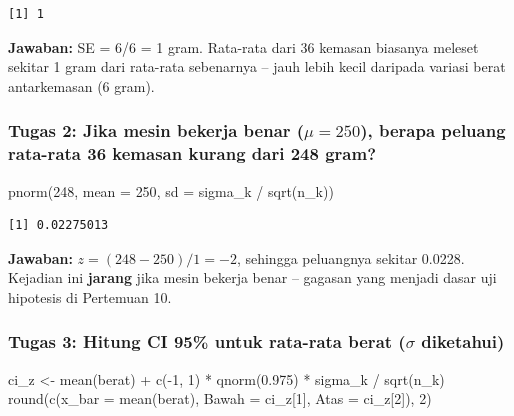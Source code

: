 \documentclass[
  indonesian,
  letterpaper,
]{book}
\newenvironment{Shaded}{\begin{snugshade}}{\end{snugshade}}
\newcommand{\AttributeTok}[1]{\textcolor[rgb]{0.40,0.45,0.13}{#1}}
\newcommand{\DecValTok}[1]{\textcolor[rgb]{0.68,0.00,0.00}{#1}}
\newcommand{\FloatTok}[1]{\textcolor[rgb]{0.68,0.00,0.00}{#1}}
\newcommand{\FunctionTok}[1]{\textcolor[rgb]{0.28,0.35,0.67}{#1}}
\newcommand{\NormalTok}[1]{\textcolor[rgb]{0.00,0.23,0.31}{#1}}
\newcommand{\OtherTok}[1]{\textcolor[rgb]{0.00,0.23,0.31}{#1}}
\newcommand{\SpecialCharTok}[1]{\textcolor[rgb]{0.37,0.37,0.37}{#1}}
\begin{document}
\begin{verbatim}
[1] 1
\end{verbatim}

\textbf{Jawaban:} SE = 6/6 = 1 gram. Rata-rata dari 36 kemasan biasanya
meleset sekitar 1 gram dari rata-rata sebenarnya -- jauh lebih kecil
daripada variasi berat antarkemasan (6 gram).

\subsubsection{\texorpdfstring{Tugas 2: Jika mesin bekerja benar
(\(\mu = 250\)), berapa peluang rata-rata 36 kemasan kurang dari 248
gram?}{Tugas 2: Jika mesin bekerja benar (\textbackslash mu = 250), berapa peluang rata-rata 36 kemasan kurang dari 248 gram?}}\label{tugas-2-jika-mesin-bekerja-benar-mu-250-berapa-peluang-rata-rata-36-kemasan-kurang-dari-248-gram}

\begin{Shaded}
\begin{Highlighting}[]
\FunctionTok{pnorm}\NormalTok{(}\DecValTok{248}\NormalTok{, }\AttributeTok{mean =} \DecValTok{250}\NormalTok{, }\AttributeTok{sd =}\NormalTok{ sigma\_k }\SpecialCharTok{/} \FunctionTok{sqrt}\NormalTok{(n\_k))}
\end{Highlighting}
\end{Shaded}

\begin{verbatim}
[1] 0.02275013
\end{verbatim}

\textbf{Jawaban:} \(z = (248 - 250)/1 = -2\), sehingga peluangnya
sekitar 0.0228. Kejadian ini \textbf{jarang} jika mesin bekerja benar --
gagasan yang menjadi dasar uji hipotesis di Pertemuan 10.

\subsubsection{\texorpdfstring{Tugas 3: Hitung CI 95\% untuk rata-rata
berat (\(\sigma\)
diketahui)}{Tugas 3: Hitung CI 95\% untuk rata-rata berat (\textbackslash sigma diketahui)}}\label{tugas-3-hitung-ci-95-untuk-rata-rata-berat-sigma-diketahui}

\begin{Shaded}
\begin{Highlighting}[]
\NormalTok{ci\_z }\OtherTok{\textless{}{-}} \FunctionTok{mean}\NormalTok{(berat) }\SpecialCharTok{+} \FunctionTok{c}\NormalTok{(}\SpecialCharTok{{-}}\DecValTok{1}\NormalTok{, }\DecValTok{1}\NormalTok{) }\SpecialCharTok{*} \FunctionTok{qnorm}\NormalTok{(}\FloatTok{0.975}\NormalTok{) }\SpecialCharTok{*}\NormalTok{ sigma\_k }\SpecialCharTok{/} \FunctionTok{sqrt}\NormalTok{(n\_k)}
\FunctionTok{round}\NormalTok{(}\FunctionTok{c}\NormalTok{(}\AttributeTok{x\_bar =} \FunctionTok{mean}\NormalTok{(berat), }\AttributeTok{Bawah =}\NormalTok{ ci\_z[}\DecValTok{1}\NormalTok{], }\AttributeTok{Atas =}\NormalTok{ ci\_z[}\DecValTok{2}\NormalTok{]), }\DecValTok{2}\NormalTok{)}
\end{Highlighting}
\end{Shaded}
\end{document}
